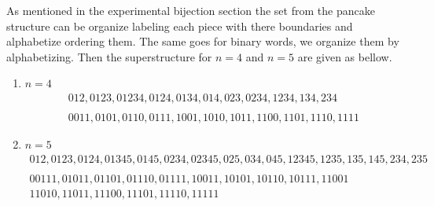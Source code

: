 \documentclass[a4paper,10pt]{article}
\begin{document}
As mentioned in the experimental bijection section the set from the pancake structure can be organize labeling each piece with there boundaries and alphabetize ordering them. The same goes for binary words, we organize them by alphabetizing. Then the superstructure for $n=4$ and $n=5$ are given as bellow. 

\begin{enumerate}
		\item $n=4$\\
		\[
		\boxed{
		\begin{gathered}
	{012,0123,01234,0124,0134,014,023,0234,1234,134,234} \\
	\\
	{0011, 0101, 0110, 0111, 1001, 1010, 1011, 1100, 1101, 1110, 1111}
		\end{gathered}
		}
		\]
		\item $n=5$\\
		\[
		\boxed{
		\begin{gathered}
		{012,0123,0124,01345,0145,0234,02345,025,034,045,12345,1235,135,145,234,235}\\
		\\
		{00111, 01011, 01101, 01110, 01111, 10011, 10101, 10110, 10111, 11001}\\ {11010, 11011, 11100, 11101, 11110, 11111}\\ 
		\end{gathered}
		}
		\]
\end{enumerate}
\end{document}

